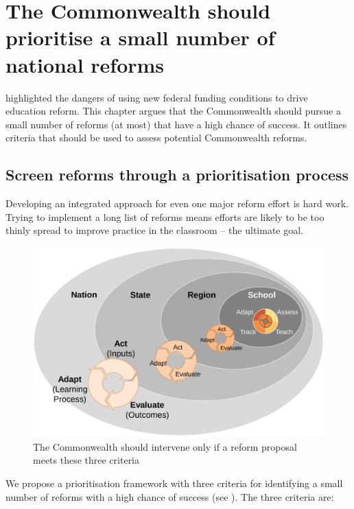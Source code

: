 \chapter{The Commonwealth should prioritise a small number of national reforms}\label{chap:few-reforms}

 highlighted the dangers of using new federal funding conditions to drive education reform. This chapter argues that the Commonwealth should pursue a small number of reforms (at most) that have a high chance of success. It outlines criteria that should be used to assess potential Commonwealth reforms.

\section{Screen reforms through a prioritisation process}\label{sec:screen-reforms}

Developing an integrated approach for even one major reform effort is hard work. Trying to implement a long list of reforms means efforts are likely to be too thinly spread to improve practice in the classroom -- the ultimate goal.

\begin{figure}
\caption{The Commonwealth should intervene only if a reform proposal meets these three criteria}\label{fig:criteria-to-determine-if-proposed-reforms}
\includegraphics[page=3]{charts/GonskiReportCharts.pdf}
\end{figure}

We propose a prioritisation framework with three criteria for identifying a small number of reforms with a high chance of success (see ). The three criteria are: 

